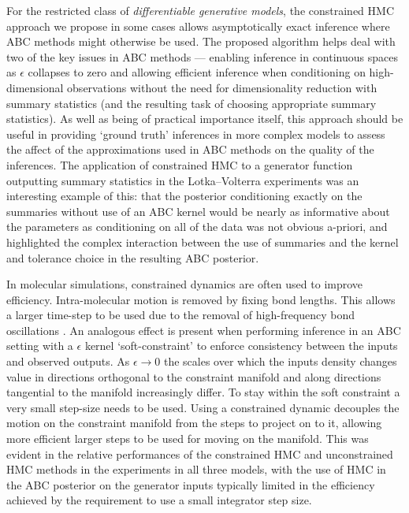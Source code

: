 For the restricted class of \emph{differentiable generative models}, the constrained \ac{HMC} approach we propose in some cases allows asymptotically exact inference where \ac{ABC} methods might otherwise be used. The proposed algorithm helps deal with two of the key issues in \ac{ABC} methods --- enabling inference in continuous spaces as $\epsilon$ collapses to zero and allowing efficient inference when conditioning on high-dimensional observations without the need for dimensionality reduction with summary statistics (and the resulting task of choosing appropriate summary statistics). As well as being of practical importance itself, this approach should be useful in providing `ground truth' inferences in more complex models to assess the affect of the approximations used in \ac{ABC} methods on the quality of the inferences. The application of constrained \ac{HMC} to a generator function outputting summary statistics in the Lotka--Volterra experiments was an interesting example of this: that the posterior conditioning exactly on the summaries without use of an \ac{ABC} kernel would be nearly as informative about the parameters as conditioning on all of the data was not obvious a-priori, and highlighted the complex interaction between the use of summaries and the kernel and tolerance choice in the resulting \ac{ABC} posterior.

In molecular simulations, constrained dynamics are often used to improve efficiency. Intra-molecular motion is removed by fixing bond lengths. This allows a larger time-step to be used due to the removal of high-frequency bond oscillations \citep{leimkuhler2016efficient}. An analogous effect is present when performing inference in an \ac{ABC} setting with a $\epsilon$ kernel `soft-constraint' to enforce consistency between the inputs and observed outputs. As $\epsilon \to 0$ the scales over which the inputs density changes value in directions orthogonal to the constraint manifold and along directions tangential to the manifold increasingly differ. To stay within the soft constraint a very small step-size needs to be used. Using a constrained dynamic decouples the motion on the constraint manifold from the steps to project on to it, allowing more efficient larger steps to be used for moving on the manifold. This was evident in the relative performances of the constrained \ac{HMC} and unconstrained \ac{HMC} methods in the experiments in all three models, with the use of \ac{HMC} in the \ac{ABC} posterior on the generator inputs typically limited in the efficiency achieved by the requirement to use a small integrator step size.


